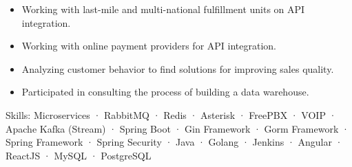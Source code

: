 {\begin{cvitems}
{\begin{itemize}
                \item { Working with last-mile and multi-national fulfillment units on API integration. }
                \item { Working with online payment providers for API integration. }
                \item { Analyzing customer behavior to find solutions for improving sales quality. }
                \item { Participated in consulting the process of building a data warehouse. }
            \end{itemize}
        }
        \item {Skills: Microservices · RabbitMQ · Redis · Asterisk · FreePBX · VOIP · Apache Kafka (Stream) · Spring Boot · Gin Framework · Gorm Framework · Spring Framework · Spring Security · Java · Golang · Jenkins · Angular · ReactJS · MySQL · PostgreSQL}
      \end{cvitems}
    }

